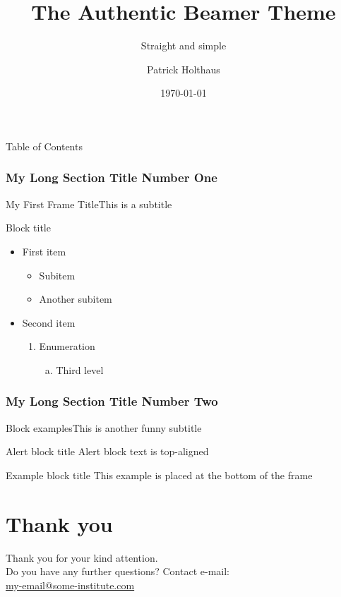 \documentclass[utf8,compress,aspectratio=169]{beamer}
\title{The Authentic Beamer Theme}
\subtitle{Straight and simple}
\author{Patrick Holthaus}
\date{\today}
\begin{document}
\titleframe

\begin{frame}{Table of Contents}{}
    \tableofcontents
\end{frame}

\section[First Section Title]{My Long Section Title Number One}
\begin{frame}[<+->][c]{My First Frame Title}{This is a subtitle}
\begin{block}{Block title}
  \begin{itemize}
    \item First item
    \begin{itemize}
        \item Subitem
        \item Another subitem
    \end{itemize}
    \item Second item
    \begin{enumerate}[1]
        \item Enumeration
        \begin{enumerate}[a)]
        \item Third level
    \end{enumerate}
    \end{enumerate}
  \end{itemize}
  \end{block}
\end{frame}

\section[Second Section Title]{My Long Section Title Number Two}
\begin{frame}[<+->][t]{Block examples}{This is another funny subtitle}
\begin{alertblock}{Alert block title}
    Alert block text is top-aligned
\end{alertblock}
\tobottom
\begin{exampleblock}{Example block title}
    This example is placed at the bottom of the frame
\end{exampleblock}
\end{frame}

\part{Thank you}
\begin{frame}[c]{\quad}{\quad}
\centering
Thank you for your kind attention.\\Do you have any further questions?
\vfill
Contact e-mail:\\[.5em]
\href{mailto:my-email@some-institute.com}{my-email@some-institute.com}
\end{frame}
\end{document}
